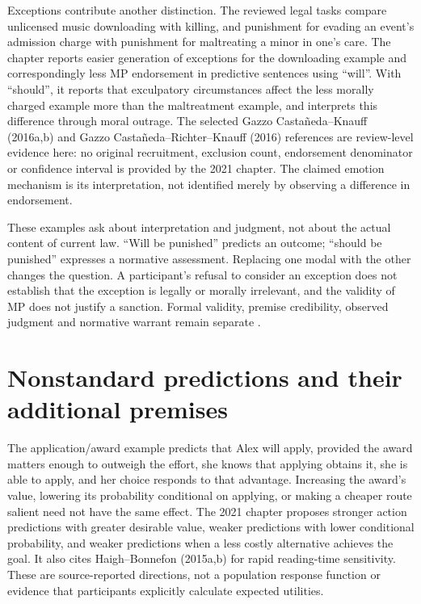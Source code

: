 Exceptions contribute another distinction. The reviewed legal tasks compare
unlicensed music downloading with killing, and punishment for evading an
event's admission charge with punishment for maltreating a minor in one's
care. The chapter reports easier generation of exceptions for the downloading
example and correspondingly less MP endorsement in predictive sentences
using ``will''. With ``should'', it reports that exculpatory circumstances
affect the less morally charged example more than the maltreatment example,
and interprets this difference through moral outrage. The selected
Gazzo Casta\~neda--Knauff (2016a,b) and Gazzo Casta\~neda--Richter--Knauff
(2016) references are review-level evidence here: no original recruitment,
exclusion count, endorsement denominator or confidence interval is provided
by the 2021 chapter. The claimed emotion mechanism is its interpretation,
not identified merely by observing a difference in endorsement.

These examples ask about interpretation and judgment, not about the actual
content of current law. ``Will be punished'' predicts an outcome; ``should
be punished'' expresses a normative assessment. Replacing one modal with the
other changes the question. A participant's refusal to consider an exception
does not establish that the exception is legally or morally irrelevant,
and the validity of MP does not justify a sanction. Formal validity,
premise credibility, observed judgment and normative warrant remain separate
\cite[p.~421]{Bonnefon2021Utility}.

\section{Nonstandard predictions and their additional premises}
\label{sec:p19-r64-nonstandard}

The application/award example predicts that Alex will apply, provided the
award matters enough to outweigh the effort, she knows that applying obtains
it, she is able to apply, and her choice responds to that advantage. Increasing
the award's value, lowering its probability conditional on applying, or
making a cheaper route salient need not have the same effect. The 2021
chapter proposes stronger action predictions with greater desirable value,
weaker predictions with lower conditional probability, and weaker predictions
when a less costly alternative achieves the goal. It also cites
Haigh--Bonnefon (2015a,b) for rapid reading-time sensitivity. These are
source-reported directions, not a population response function or evidence
that participants explicitly calculate expected utilities.

